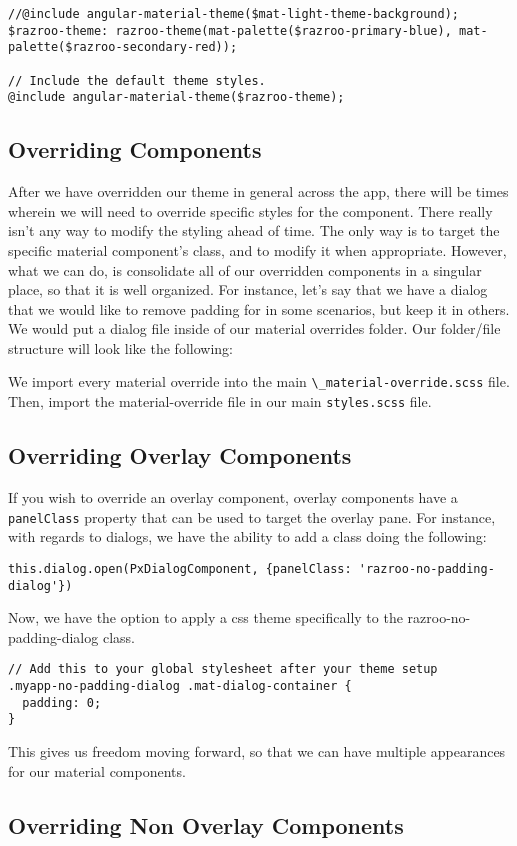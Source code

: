 \begin{lstlisting}[caption=html and body override]
//@include angular-material-theme($mat-light-theme-background);
$razroo-theme: razroo-theme(mat-palette($razroo-primary-blue), mat-palette($razroo-secondary-red));

// Include the default theme styles.
@include angular-material-theme($razroo-theme);  
\end{lstlisting}

\subsection{Overriding Components}
After we have overridden our theme in general across the app, there will be 
times wherein we will need to override specific styles for the component. 
There really isn't any way to modify the styling ahead of time. The only way
is to target the specific material component's class, and to modify it when 
appropriate. However, what we can do, is consolidate all of our overridden
components in a singular place, so that it is well organized. For instance, 
let's say that we have a dialog that we would like to remove padding for 
in some scenarios, but keep it in others. We would put a dialog file inside of
our material overrides folder. Our folder/file structure will look like the
following: 



We import every material override into the main 
\lstinline{\_material-override.scss} file. Then, import the material-override 
file in our main \lstinline{styles.scss} file. 

\subsection{Overriding Overlay Components}
If you wish to override an overlay component, overlay components have a 
\lstinline{panelClass} property that can be used to target the overlay pane. 
For instance, with regards to dialogs, we have the ability to add a class doing
the following: 
\begin{lstlisting}
this.dialog.open(PxDialogComponent, {panelClass: 'razroo-no-padding-dialog'}) 
\end{lstlisting}

Now, we have the option to apply a css theme specifically to the 
razroo-no-padding-dialog class. 

\begin{lstlisting}
// Add this to your global stylesheet after your theme setup
.myapp-no-padding-dialog .mat-dialog-container {
  padding: 0;
}
\end{lstlisting}

This gives us freedom moving forward, so that we can have multiple appearances
for our material components.

\subsection{Overriding Non Overlay Components}

